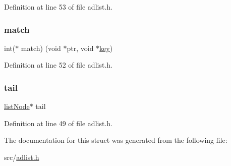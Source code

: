 Definition at line 53 of file adlist.\+h.

\mbox{\label{structlist_aff6f26982c3b0583ccfd1ca09f8e624e}} 
\subsubsection{\texorpdfstring{match}{match}}
{\footnotesize\ttfamily int($\ast$ match) (void $\ast$ptr, void $\ast$\hyperlink{redis-check-rdb_8c_adc0ee0ed345db513fb6fac27511be4f1}{key})}



Definition at line 52 of file adlist.\+h.

\mbox{\label{structlist_a769990d42e7c5a221c6a517bef9c19c0}} 
\subsubsection{\texorpdfstring{tail}{tail}}
{\footnotesize\ttfamily \hyperlink{structlist_node}{list\+Node}$\ast$ tail}



Definition at line 49 of file adlist.\+h.



The documentation for this struct was generated from the following file\+:\begin{DoxyCompactItemize}
\item 
src/\hyperlink{adlist_8h}{adlist.\+h}\end{DoxyCompactItemize}
